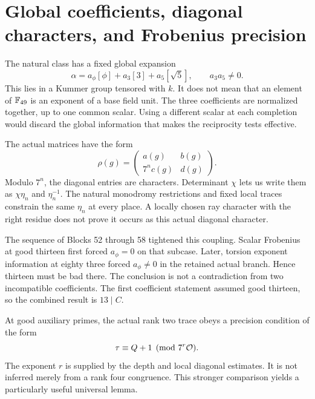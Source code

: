 \section{Global coefficients, diagonal characters, and Frobenius precision}\label{sec:coefficients}
The natural class has a fixed global expansion
\begin{equation}\label{eq:globalalpha}
\alpha=a_\phi[\phi]+a_3[3]+a_5[\sqrt5],\qquad a_3a_5\ne0.
\end{equation}
This lies in a Kummer group tensored with $k$. It does not mean that an element of $\mathbb F_{49}$ is an exponent of a base field unit. The three coefficients are normalized together, up to one common scalar. Using a different scalar at each completion would discard the global information that makes the reciprocity tests effective.

The actual matrices have the form
\[
\rho(g)=\begin{pmatrix}a(g)&b(g)\\7^nc(g)&d(g)\end{pmatrix}.
\]
Modulo $7^n$, the diagonal entries are characters. Determinant $\chi$ lets us write them as $\chi\eta_n$ and $\eta_n^{-1}$. The natural monodromy restrictions and fixed local traces constrain the same $\eta_n$ at every place. A locally chosen ray character with the right residue does not prove it occurs as this actual diagonal character.

The sequence of Blocks 52 through 58 tightened this coupling. Scalar Frobenius at good thirteen first forced $a_\phi=0$ on that subcase. Later, torsion exponent information at eighty three forced $a_\phi\ne0$ in the retained actual branch. Hence thirteen must be bad there. The conclusion is not a contradiction from two incompatible coefficients. The first coefficient statement assumed good thirteen, so the combined result is $13\mid C$.

At good auxiliary primes, the actual rank two trace obeys a precision condition of the form
\[
\tau\equiv Q+1\pmod{7^r\mathcal O}.
\]
The exponent $r$ is supplied by the depth and local diagonal estimates. It is not inferred merely from a rank four congruence. This stronger comparison yields a particularly useful universal lemma.

